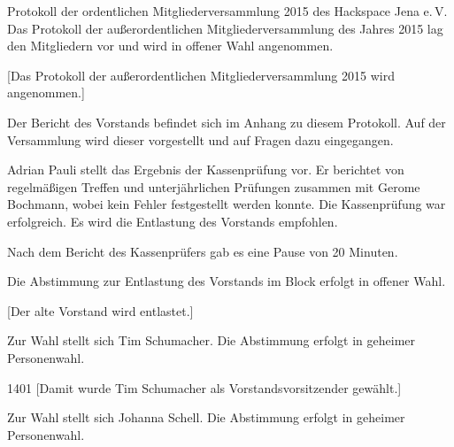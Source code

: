 \documentclass[ngerman]{scrartcl}
\begin{document}
\begin{Protokoll}{Protokoll der ordentlichen Mitgliederversammlung 2015 des Hackspace Jena e.\,V.}
Das Protokoll der außerordentlichen Mitgliederversammlung des Jahres
2015 lag den Mitgliedern vor und wird in offener Wahl angenommen.

\begin{Abstimmung}
  [Das Protokoll der außerordentlichen Mitgliederversammlung 2015 wird angenommen.]
\end{Abstimmung}


Der Bericht des Vorstands befindet sich im Anhang zu diesem
Protokoll. Auf der Versammlung wird dieser vorgestellt und auf Fragen
dazu eingegangen.



Adrian Pauli stellt das Ergebnis der Kassenprüfung vor. Er berichtet
von regelmäßigen Treffen und unterjährlichen Prüfungen zusammen mit
Gerome Bochmann, wobei kein Fehler festgestellt werden konnte. Die
Kassenprüfung war erfolgreich. Es wird die Entlastung des Vorstands
empfohlen.

Nach dem Bericht des Kassenprüfers gab es eine Pause von 20 Minuten.


Die Abstimmung zur Entlastung des Vorstands im Block erfolgt in offener Wahl.
\begin{Abstimmung}
  [Der alte Vorstand wird entlastet.]
\end{Abstimmung}




Zur Wahl stellt sich Tim Schumacher. Die Abstimmung erfolgt in geheimer
Personenwahl.

\begin{Abstimmung}
  {14}{0}{1}
  [Damit wurde Tim Schumacher als Vorstandsvorsitzender gewählt.]
\end{Abstimmung}



Zur Wahl stellt sich Johanna Schell. Die Abstimmung erfolgt in geheimer Personenwahl.


\end{Protokoll}
\end{document}
